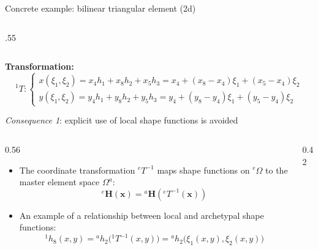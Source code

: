 \documentclass[aspectratio=169]{beamer}
\begin{document}
{\begin{frame}{Concrete example: bilinear triangular element (2d)}
\begin{columns}[T]
\begin{column}{.55\textwidth}
          \end{column}
      \end{columns}
      \vspace{0.2cm}
      \hspace{-0.3cm}\textbf{Transformation:}
      $${}^1T:\begin{cases*}
              x(\xi_1,\xi_2) =  x_4 h_1 + x_8 h_2 + x_5 h_3  = x_4+(x_8-x_4)\xi_1+(x_5-x_4)\xi_2 \\
              y(\xi_1,\xi_2)=  y_4 h_1 + y_8 h_2 + y_5 h_3 = y_4+(y_8-y_4)\xi_1+(y_5-y_4)\xi_2
          \end{cases*}$$
  \end{frame}

  \begin{frame}{\emph{Consequence 1}: explicit use of local shape functions is avoided}
      \vspace{-0.4cm}
      \begin{columns}[T,onlytextwidth]
          \begin{column}{0.56\textwidth}
              \begin{itemize}
                  \item The coordinate transformation ${}^eT^{-1}$ maps shape functions on ${}^e\Omega$ to the master element space $\Omega^a$:
                        \[
                            {}^e\mathbf H(\mathbf x)
                            =
                            {}^a\mathbf H({}^eT^{-1}(\mathbf x))
                        \]
                  \item An example of a relationship between local and archetypal shape functions:
                        \[
                            {}^1h_8(x,y)
                            =
                            {}^ah_2\big({}^1T^{-1}(x,y)\big)
                            =
                            {}^ah_2\big(\xi_1(x,y),\xi_2(x,y)\big)
                        \]
              \end{itemize}
          \end{column}

          \begin{column}{0.42\textwidth}
              \centering
              \vspace{0.4cm}
\end{column}
\end{columns}
\end{frame}}
\end{document}
